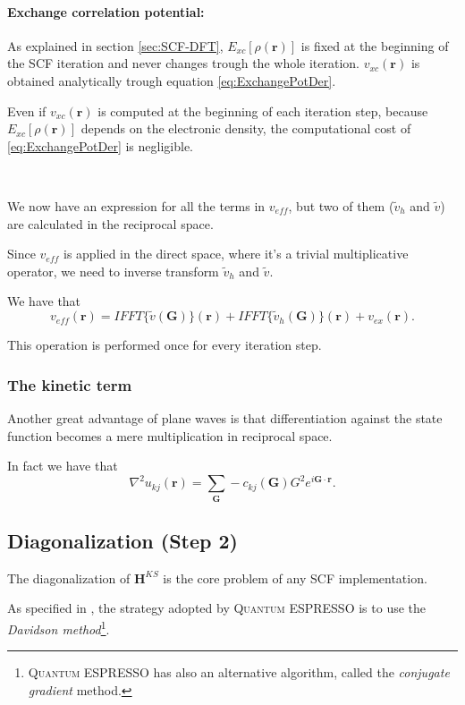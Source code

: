 \documentclass[a4paper,12pt]{article}
\newcommand\mf[1]{\mathbf{#1}}
\newcommand\dens{\rho(\mathbf{r})}
\newcommand\erre{\mathbf{r}}
\newcommand\GI{\mathbf{G}}
\newcommand\QE{\textsc{Quantum} ESPRESSO }
\begin{document}
\paragraph{Exchange correlation potential:} 
As explained in section \ref{sec:SCF-DFT}, $E_{xc}[\dens]$ is fixed at the beginning of the SCF iteration and never changes trough the whole iteration. $v_{xc}(\erre)$ is obtained analytically trough equation \eqref{eq:ExchangePotDer}.

Even if $v_{xc}(\erre)$ is computed at the beginning of each iteration step, because $E_{xc}[\dens]$ depends on the electronic density, the computational cost of \eqref{eq:ExchangePotDer} is negligible.


~


We now have an expression for all the terms in $v_{eff}$, but two of them ($\tilde{v}_{h}$ and $\tilde{v}$) are calculated in the reciprocal space.

Since $v_{eff}$ is applied in the direct space, where it's a trivial multiplicative operator, we need to inverse transform $\tilde{v}_{h}$ and $\tilde{v}$.

We have that
\begin{equation}
	v_{eff}(\erre) = IFFT\{\tilde{v}(\mf{G})\}(\erre) + IFFT\{\tilde{v}_{h}(\mf{G})\}(\erre) + v_{ex}(\erre).
\end{equation}

This operation is performed once for every iteration step.

\subsubsection{The kinetic term}\label{sec:KineticTerm}

Another great advantage of plane waves is that differentiation against the state function becomes a mere multiplication in reciprocal space.

In fact we have that 
\begin{equation}
	\nabla^2 u_{kj}(\erre) = \sum_{\mf{G}} - c_{kj}(\mf{G})  G^2  e^{i \GI  \cdot \erre}.
\end{equation}


\subsection{Diagonalization (Step 2)}\label{sec:Diagonalization}
The diagonalization of $\mf{H}^{KS}$ is the core problem of any SCF implementation.

As specified in \cite[Appendix A.2]{QE}, the strategy adopted by \QE is to use the \textit{Davidson method}\cite{Davidson}\footnote{\QE has also an alternative algorithm, called the \textit{conjugate gradient} method.}.
\end{document}
